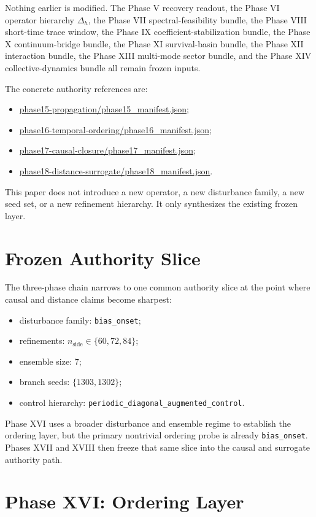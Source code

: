 \documentclass[11pt]{article}
\begin{document}
Nothing earlier is modified. The Phase V recovery readout, the Phase VI operator hierarchy $\Delta_h$, the Phase VII spectral-feasibility bundle, the Phase VIII short-time trace window, the Phase IX coefficient-stabilization bundle, the Phase X continuum-bridge bundle, the Phase XI survival-basin bundle, the Phase XII interaction bundle, the Phase XIII multi-mode sector bundle, and the Phase XIV collective-dynamics bundle all remain frozen inputs.

The concrete authority references are:
\begin{itemize}
\item \url{phase15-propagation/phase15_manifest.json};
\item \url{phase16-temporal-ordering/phase16_manifest.json};
\item \url{phase17-causal-closure/phase17_manifest.json};
\item \url{phase18-distance-surrogate/phase18_manifest.json}.
\end{itemize}

This paper does not introduce a new operator, a new disturbance family, a new seed set, or a new refinement hierarchy. It only synthesizes the existing frozen layer.

\section{Frozen Authority Slice}

The three-phase chain narrows to one common authority slice at the point where causal and distance claims become sharpest:
\begin{itemize}
\item disturbance family: \texttt{bias\_onset};
\item refinements: $n_{\mathrm{side}} \in \{60,72,84\}$;
\item ensemble size: $7$;
\item branch seeds: $\{1303,1302\}$;
\item control hierarchy: \texttt{periodic\_diagonal\_augmented\_control}.
\end{itemize}

Phase XVI uses a broader disturbance and ensemble regime to establish the ordering layer, but the primary nontrivial ordering probe is already \texttt{bias\_onset}. Phases XVII and XVIII then freeze that same slice into the causal and surrogate authority path.

\section{Phase XVI: Ordering Layer}
\end{document}
